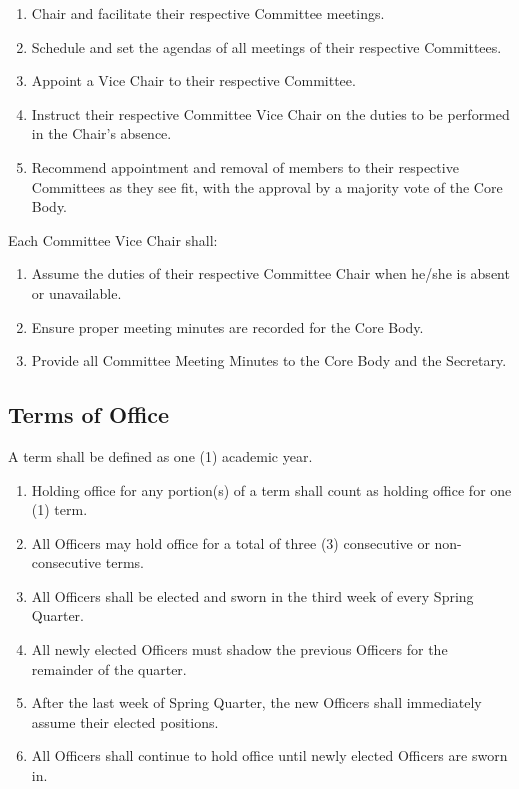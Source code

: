 \documentclass{article}
\newenvironment{li}{
\begin{enumerate}
  \setlength{\itemsep}{1pt}
  \setlength{\parskip}{0pt}
  \setlength{\parsep}{0pt}
}{\end{enumerate}}
\begin{document}
\begin{enumerate}[A.]
	\begin{li}
	\item Chair and facilitate their respective Committee meetings.
	\item Schedule and set the agendas of all meetings of their respective Committees.
	\item Appoint a Vice Chair to their respective Committee.
	\item Instruct their respective Committee Vice Chair on the duties to be performed in the Chair's absence.
	\item Recommend appointment and removal of members to their respective Committees as they see fit, with the approval by a majority vote of the Core Body.
	\end{li}

\noindent Each Committee Vice Chair shall:
\begin{li}
\item Assume the duties of their respective Committee Chair when he/she is absent or unavailable.
\item Ensure proper meeting minutes are recorded for the Core Body.
\item Provide all Committee Meeting Minutes to the Core Body and the Secretary.
\end{li}

\end{enumerate}

\subsection{Terms of Office}
A term shall be defined as one (1) academic year.
\begin{li}
\item Holding office for any portion(s) of a term shall count as holding office for one (1) term.
\item All Officers may hold office for a total of three (3) consecutive or non-consecutive terms.
\item All Officers shall be elected and sworn in the third week of every Spring Quarter.
\item All newly elected Officers must shadow the previous Officers for the remainder of the quarter.
\item After the last week of Spring Quarter, the new Officers shall immediately assume their elected positions.
\item All Officers shall continue to hold office until newly elected Officers are sworn in.
\end{li}
\end{document}
